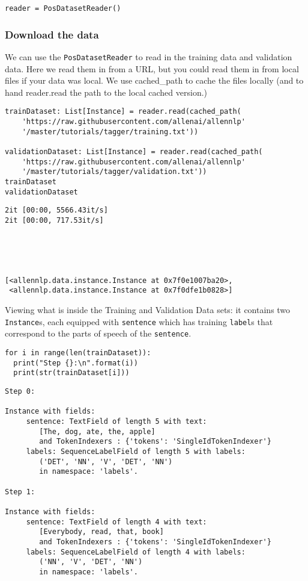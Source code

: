 \documentclass[
]{article}
\begin{document}
\begin{verbatim}
reader = PosDatasetReader()
\end{verbatim}

\hypertarget{download-the-data}{%
\subsubsection{Download the data}\label{download-the-data}}

We can use the \texttt{PosDatasetReader} to read in the training data
and validation data. Here we read them in from a URL, but you could read
them in from local files if your data was local. We use cached\_path to
cache the files locally (and to hand reader.read the path to the local
cached version.)

\begin{verbatim}
trainDataset: List[Instance] = reader.read(cached_path(
    'https://raw.githubusercontent.com/allenai/allennlp'
    '/master/tutorials/tagger/training.txt'))

validationDataset: List[Instance] = reader.read(cached_path(
    'https://raw.githubusercontent.com/allenai/allennlp'
    '/master/tutorials/tagger/validation.txt'))
trainDataset
validationDataset
\end{verbatim}

\begin{verbatim}
2it [00:00, 5566.43it/s]
2it [00:00, 717.53it/s]





[<allennlp.data.instance.Instance at 0x7f0e1007ba20>,
 <allennlp.data.instance.Instance at 0x7f0dfe1b0828>]
\end{verbatim}

Viewing what is inside the Training and Validation Data sets: it
contains two \texttt{Instance}s, each equipped with \texttt{sentence}
which has training \texttt{label}s that correspond to the parts of
speech of the \texttt{sentence}.

\begin{verbatim}
for i in range(len(trainDataset)): 
  print("Step {}:\n".format(i))
  print(str(trainDataset[i]))
\end{verbatim}

\begin{verbatim}
Step 0:

Instance with fields:
     sentence: TextField of length 5 with text: 
        [The, dog, ate, the, apple]
        and TokenIndexers : {'tokens': 'SingleIdTokenIndexer'} 
     labels: SequenceLabelField of length 5 with labels:
        ('DET', 'NN', 'V', 'DET', 'NN')
        in namespace: 'labels'. 

Step 1:

Instance with fields:
     sentence: TextField of length 4 with text: 
        [Everybody, read, that, book]
        and TokenIndexers : {'tokens': 'SingleIdTokenIndexer'} 
     labels: SequenceLabelField of length 4 with labels:
        ('NN', 'V', 'DET', 'NN')
        in namespace: 'labels'. 
\end{verbatim}
\end{document}
